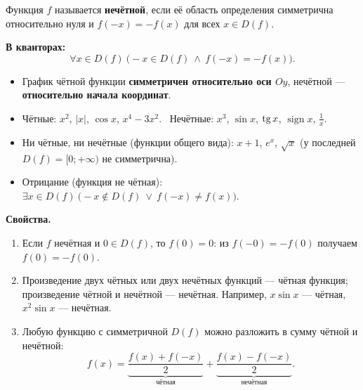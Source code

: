 \documentclass[a4paper,11pt]{article}
\newcommand{\kv}{\par\noindent\textbf{\textcolor{oprc!85!black}{В кванторах:}}}
\begin{document}
\begin{opr}
Функция $f$ называется \textbf{нечётной}, если её область определения симметрична относительно нуля и $f(-x) = -f(x)$ для всех $x \in D(f)$.
\kv
\[
  \forall x \in D(f)\ \bigl( -x \in D(f) \ \wedge\ f(-x) = -f(x) \bigr).
\]
\end{opr}

\begin{itemize}[leftmargin=*]
  \item График чётной функции \textbf{симметричен относительно оси $Oy$}, нечётной --- \textbf{относительно начала координат}.
  \item Чётные: $x^2$, $|x|$, $\cos x$, $x^4 - 3x^2$. \ Нечётные: $x^3$, $\sin x$, $\operatorname{tg} x$, $\operatorname{sign} x$, $\frac1x$.
  \item Ни чётные, ни нечётные (функции общего вида): $x + 1$, $e^x$, $\sqrt{x}$ (у последней $D(f) = [0; +\infty)$ не симметрична).
  \item Отрицание (функция не чётная): $\exists x \in D(f)\ \bigl(-x \notin D(f) \ \vee\ f(-x) \ne f(x)\bigr)$.
\end{itemize}

\textbf{Свойства.}
\begin{enumerate}[leftmargin=*]
  \item Если $f$ нечётная и $0 \in D(f)$, то $f(0) = 0$: из $f(-0) = -f(0)$ получаем $f(0) = -f(0)$.
  \item Произведение двух чётных или двух нечётных функций --- чётная функция; произведение чётной и нечётной --- нечётная.
        Например, $x \sin x$ --- чётная, $x^2 \sin x$ --- нечётная.
  \item Любую функцию с симметричной $D(f)$ можно разложить в сумму чётной и нечётной:
        \[
          f(x) = \underbrace{\frac{f(x) + f(-x)}{2}}_{\text{чётная}} + \underbrace{\frac{f(x) - f(-x)}{2}}_{\text{нечётная}}.
        \]
\end{enumerate}

\begin{center}
\qquad\qquad
{}
\end{center}
\end{document}
